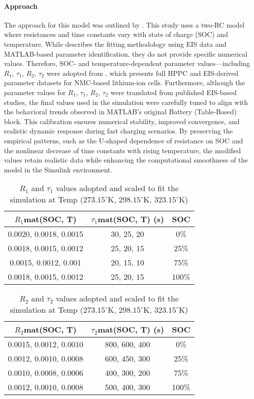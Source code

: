 \documentclass[conference]{IEEEtran}
\begin{document}
\paragraph{\textbf{Approach}} The approach for this model was outlined by \cite{mondal}. This study uses a two-RC model where resistances and time constants vary with state of charge (SOC) and temperature. While \cite{mondal} describes the fitting methodology using EIS data and MATLAB-based parameter identification, they do not provide specific numerical values. Therefore, SOC‑ and temperature‑dependent parameter values—including $R_1$, $\tau_1$, $R_2$, $\tau_2$ were adopted from \cite{Wang}, which presents full HPPC and EIS-derived parameter datasets for NMC-based lithium-ion cells. Furthermore, although the parameter values for $R_1$, $\tau_1$, $R_2$, $\tau_2$ were translated from published EIS-based studies, the final values used in the simulation were carefully tuned to align with the behavioral trends observed in MATLAB's original Battery (Table-Based) block. This calibration ensures numerical stability, improved convergence, and realistic dynamic response during fast charging scenarios. By preserving the empirical patterns, such as the U-shaped dependence of resistance on SOC and the nonlinear decrease of time constants with rising temperature, the modified values retain realistic data while enhancing the computational smoothness of the model in the Simulink environment.

\begin{table}[H]
\centering
\caption{$R_1$ and $\tau_1$ values adopted and scaled to fit the simulation at Temp ($273.15^\circ$K, $298.15^\circ$K, $323.15^\circ$K)}
\begin{tabular}{|c|c|c|}
\hline
\textbf{$R_1$mat(SOC, T)} & \textbf{$\tau_1$mat(SOC, T) (s)} & \textbf{SOC} \\
\hline
0.0020, 0.0018, 0.0015 & 30, 25, 20 & 0\%\\
0.0018, 0.0015, 0.0012 & 25, 20, 15 & 25\% \\
0.0015, 0.0012, 0.001 & 20, 15, 10 & 75\%\\
0.0018, 0.0015, 0.0012 & 25, 20, 15 & 100\% \\
\hline
\end{tabular}
\end{table}


\begin{table}[H]
\centering
\caption{$R_2$ and $\tau_2$ values adopted and scaled to fit the simulation at Temp ($273.15^\circ$K, $298.15^\circ$K, $323.15^\circ$K)}
\begin{tabular}{|c|c|c|}
\hline
\textbf{$R_2$mat(SOC, T)} & \textbf{$\tau_2$mat(SOC, T) (s)} & \textbf{SOC}\\
\hline
0.0015, 0.0012, 0.0010 & 800, 600, 400 & 0\% \\
0.0012, 0.0010, 0.0008 & 600, 450, 300 & 25\% \\
0.0010, 0.0008, 0.0006 & 400, 300, 200 & 75\% \\
0.0012, 0.0010, 0.0008 & 500, 400, 300 & 100\%\\
\hline
\end{tabular}
\end{table}
\end{document}
